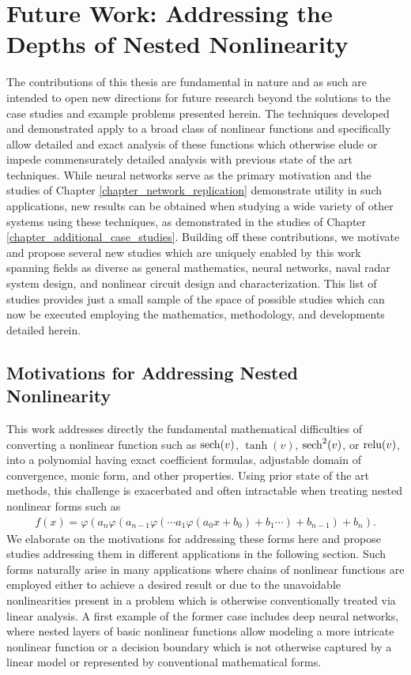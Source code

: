 \chapter{Future Work: Addressing the Depths of Nested Nonlinearity}

\label{chapter_future_work}

The contributions of this thesis are fundamental in nature and as such are intended to open new directions for future research beyond the solutions to the case studies and example problems presented herein.  The techniques developed and demonstrated apply to a broad class of nonlinear functions and specifically allow detailed and exact analysis of these functions which otherwise elude or impede commensurately detailed analysis with previous state of the art techniques.  While neural networks serve as the primary motivation and the studies of Chapter \ref{chapter_network_replication} demonstrate utility in such applications, new results can be obtained when studying a wide variety of other systems using these techniques, as demonstrated in the studies of Chapter \ref{chapter_additional_case_studies}.  Building off these contributions, we motivate and propose several new studies which are uniquely enabled by this work spanning fields as diverse as general mathematics, neural networks, naval radar system design, and nonlinear circuit design and characterization.  This list of studies provides just a small sample of the space of possible studies which can now be executed employing the mathematics, methodology, and developments detailed herein.

\section{Motivations for Addressing Nested Nonlinearity}
This work addresses directly the fundamental mathematical difficulties of converting a nonlinear function such as $\operatorname{sech}(v)$, $\tanh(v)$, $\operatorname{sech}^2(v)$, or $\operatorname{relu}(v)$,  into a polynomial having exact coefficient formulas, adjustable domain of convergence, monic form, and other properties.  Using prior state of the art methods, this challenge is exacerbated and often intractable when treating nested nonlinear forms such as
\begin{align}
	f(x) = \varphi(a_n \varphi( a_{n-1} \varphi( \cdots a_1 \varphi(a_0 x + b_0) + b_1\cdots ) + b_{n-1}) + b_n). \label{eq_nested_nonlinearity}
\end{align}
We elaborate on the motivations for addressing these forms here and propose studies addressing them in different applications in the following section.  Such forms naturally arise in many applications where chains of nonlinear functions are employed either to achieve a desired result or due to the unavoidable nonlinearities present in a problem which is otherwise conventionally treated via linear analysis.  A first example of the former case includes deep neural networks, where nested layers of basic nonlinear functions allow modeling a more intricate nonlinear function or a decision boundary which is not otherwise captured by a linear model or represented by conventional mathematical forms.

